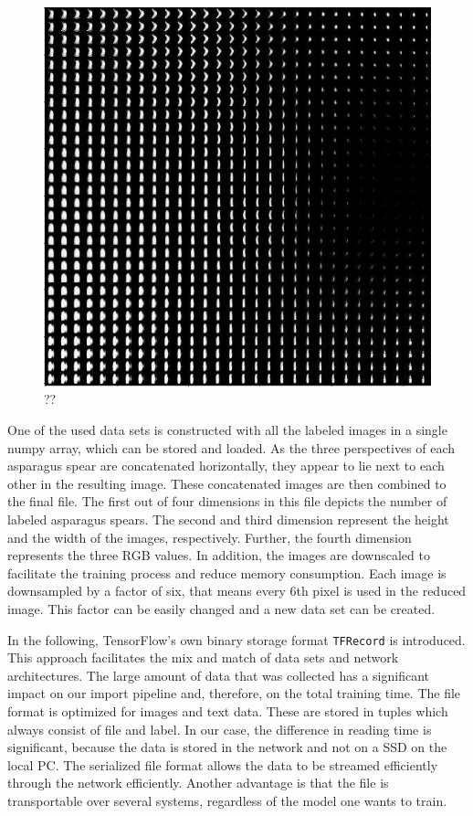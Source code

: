 \begin{figure}[!ht]
	\centering
	\includegraphics[scale=0.55]{Figures/chapter03/latent-space-square.png}
	\decoRule
	\caption[??]{??}
	\label{fig:LatentSquare}
\end{figure}

\bigskip
One of the used data sets is constructed with all the labeled images in a single numpy array, which can be stored and loaded. As the three perspectives of each asparagus spear are concatenated horizontally, they appear to lie next to each other in the resulting image. These concatenated images are then combined to the final file. The first out of four dimensions in this file depicts the number of labeled asparagus spears. The second and third dimension represent the height and the width of the images, respectively. Further, the fourth dimension represents the three RGB values.
In addition, the images are downscaled to facilitate the training process and reduce memory consumption. Each image is downsampled by a factor of six, that means every 6th pixel is used in the reduced image. This factor can be easily changed and a new data set can be created. 

\bigskip
In the following, TensorFlow's own binary storage format \texttt{TFRecord} is introduced. This approach facilitates the mix and match of data sets and network architectures. The large amount of data that was collected has a significant impact on our import pipeline and, therefore, on the total training time. The file format is optimized for images and text data. These are stored in tuples which always consist of file and label. In our case, the difference in reading time is significant, because the data is stored in the network and not on a SSD on the local PC. The serialized file format allows the data to be streamed efficiently through the network efficiently. Another advantage is that the file is transportable over several systems, regardless of the model one wants to train.

